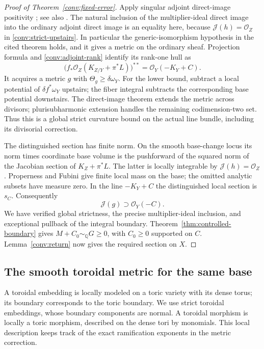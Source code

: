 \begin{proof}[Proof of Theorem~\ref{conv:fixed-error}]
Apply singular adjoint direct-image positivity
\cite[Theorem~3.3.5]{PT2018}; see also
\cite[Theorem~21.1 and Corollary~21.2]{HPS2018}.
The natural inclusion of the multiplier-ideal direct image into the
ordinary adjoint direct image is an equality here, because
$\mathcal J(h)=\mathcal O_Z$ in \eqref{conv:strict-upstairs}.
In particular the generic-isomorphism hypothesis in the cited theorem
holds, and it gives a metric on the ordinary sheaf.  Projection formula and
\eqref{conv:adjoint-rank} identify its rank-one hull as
\[
 \bigl(f_*\mathcal O_Z(K_{Z/Y}+\pi^*L)\bigr)^{**}
   =\mathcal O_Y(-K_Y+C).
\]
It acquires a metric $g$ with $\Theta_g\ge\delta\omega_Y$.
For the lower bound, subtract a local potential of
$\delta f^*\omega_Y$ upstairs; the fiber integral subtracts the
corresponding base potential downstairs.  The direct-image theorem
extends the metric across divisors; plurisubharmonic extension handles
the remaining codimension-two set.  Thus this is a global strict
curvature bound on the actual line bundle, including its divisorial
correction.

The distinguished section has finite norm.  On the smooth base-change
locus its norm times coordinate base volume is the pushforward of the
squared norm of the Jacobian section of $K_Z+\pi^*L$.
The latter is locally integrable by $\mathcal J(h)=\mathcal O_Z$.
Properness and Fubini give finite local mass on the base; the omitted
analytic subsets have measure zero.  In the line $-K_Y+C$ the
distinguished local section is $s_C$.  Consequently
\[
 \mathcal J(g)\supset\mathcal O_Y(-C).
\]
We have verified global strictness, the precise multiplier-ideal
inclusion, and exceptional pullback of the integral boundary.
Theorem~\ref{thm:controlled-boundary} gives
$M+C_0\sim_{\mathbb Q}G\ge0$, with $C_0\ge0$ supported on $C$.
Lemma~\ref{conv:return} now gives the required section on $X$.
\end{proof}

\subsection{The smooth toroidal metric for the same base}
\label{conv:toroidal-alternative}

A toroidal embedding is locally modeled on a toric variety with its
dense torus; its boundary corresponds to the toric boundary.  We use
strict toroidal embeddings, whose boundary components are normal.
A toroidal morphism is locally a toric morphism, described on the dense
tori by monomials.  This local description keeps track of the exact
ramification exponents in the metric correction.

